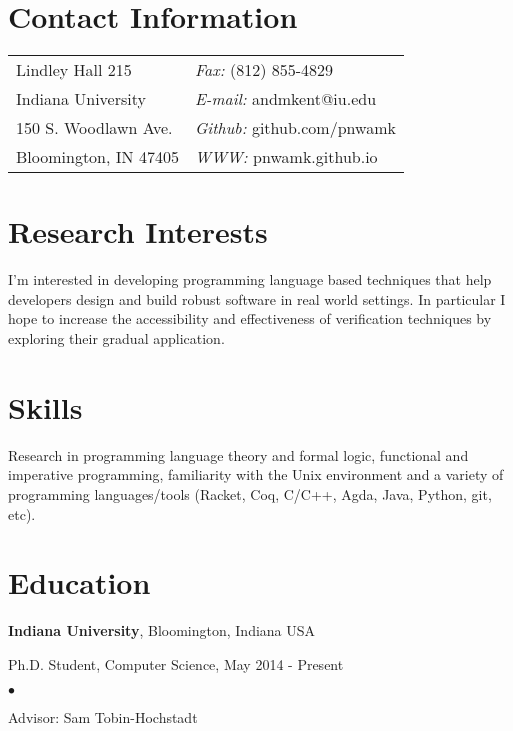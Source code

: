\documentclass[margin,line]{res}
\newenvironment{list1}{
  \begin{list}{\ding{113}}{%
      \setlength{\itemsep}{0in}
      \setlength{\parsep}{0in} \setlength{\parskip}{0in}
      \setlength{\topsep}{0in} \setlength{\partopsep}{0in} 
      \setlength{\leftmargin}{0.17in}}}{\end{list}}
\newenvironment{list2}{
  \begin{list}{$\bullet$}{%
      \setlength{\itemsep}{0in}
      \setlength{\parsep}{0in} \setlength{\parskip}{0in}
      \setlength{\topsep}{0in} \setlength{\partopsep}{0in} 
      \setlength{\leftmargin}{0.2in}}}{\end{list}}
\begin{document}

\begin{resume}
\section{\sc Contact Information}
\vspace{.05in}
\begin{tabular}{@{}p{2in}p{4in}}
Lindley Hall 215            & {\it Fax:}  (812) 855-4829 \\            
Indiana University         & {\it E-mail:} andmkent@iu.edu    \\         
150 S. Woodlawn Ave.   & {\it Github:} github.com/pnwamk  \\       
Bloomington, IN 47405 & {\it WWW:} pnwamk.github.io \\     
\end{tabular}


\section{\sc Research Interests}
I'm interested in developing programming language based techniques
that help developers design and build robust software in real world
settings.  In particular I hope to increase the accessibility and
effectiveness of verification techniques by exploring their gradual
application.

\section{\sc Skills}
Research in programming language theory and formal logic, functional
and imperative programming, familiarity with the Unix environment and
a variety of programming languages/tools (Racket, Coq, C/C++, Agda,
Java, Python, git, etc).

\section{\sc Education}
{\bf Indiana University}, Bloomington, Indiana USA\\
\vspace*{-.1in}
\begin{list1}
\item[] Ph.D. Student, Computer Science, May 2014 - Present
\begin{list2}
\vspace*{.05in}
\item Advisor:  Sam Tobin-Hochstadt
\end{list2}
\end{list1}


\end{resume}
\end{document}
